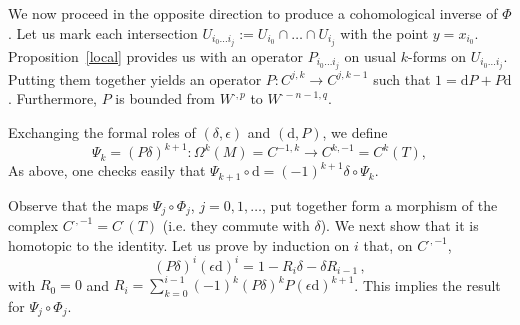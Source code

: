 \documentclass[11pt]{article}
\theoremstyle{definition}
\numberwithin{equation}{section}
\numberwithin{figure}{section}
\numberwithin{table}{section}
\newcommand{\dd}{\mathrm{d}}
\begin{document}

We now proceed in the opposite direction to produce a cohomological inverse of $\Phi$. Let us mark each intersection $U_{i_0 \dots i_j}:=U_{i_0}\cap\dots\cap U_{i_j}$ with the point $y=x_{i_0}$. Proposition~\ref{local} provides us with an operator $P_{i_0\dots i_j}$ on usual $k$-forms on $U_{i_0 \dots i_j}$. Putting them together yields an operator $P:C^{j,k}\to C^{j,k-1}$ such that $1=\dd P+P\dd$. Furthermore, $P$ is bounded from $W^{\cdot,p}$ to $W^{\cdot-n-1,q}$.

Exchanging the formal roles of $(\delta, \epsilon)$ and $(\dd,P)$, we define
\[
\Psi_k = (P\delta)^{k+1} :\Omega^k(M)=C^{-1,k}\to C^{k,-1}=C^k(T),
\]
As above, one checks easily that $\Psi_{k+1} \circ \dd = (-1)^{k+1}\delta \circ \Psi_k$.

Observe that the maps $\Psi_j \circ \Phi_j$, $j=0,1,\dots$, put together form a morphism of the complex $C^{\cdot,-1}=C^\cdot(T)$ (i.e. they commute with $\delta$). We next show that it is homotopic to the identity. Let us prove by induction on $i$ that, on $C^{\cdot,-1}$,
\begin{equation}\label{eq:7}
(P \delta)^i (\epsilon \dd)^i = 1 - R_i \delta - \delta R_{i-1}\,,
\end{equation}
with $R_0= 0$ and $R_i = \sum_{k=0}^{i-1} (-1)^k (P \delta)^k P (\epsilon \dd)^{k+1}$. This implies the result for $\Psi_j \circ \Phi_j$.
\end{document}
